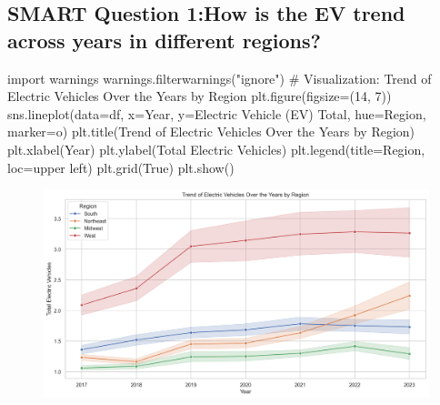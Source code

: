 \documentclass[
  letterpaper,
  DIV=11,
  numbers=noendperiod]{scrartcl}
\newenvironment{Shaded}{\begin{snugshade}}{\end{snugshade}}
\newcommand{\CommentTok}[1]{\textcolor[rgb]{0.37,0.37,0.37}{#1}}
\newcommand{\DecValTok}[1]{\textcolor[rgb]{0.68,0.00,0.00}{#1}}
\newcommand{\ImportTok}[1]{\textcolor[rgb]{0.00,0.46,0.62}{#1}}
\newcommand{\NormalTok}[1]{\textcolor[rgb]{0.00,0.23,0.31}{#1}}
\newcommand{\OperatorTok}[1]{\textcolor[rgb]{0.37,0.37,0.37}{#1}}
\newcommand{\StringTok}[1]{\textcolor[rgb]{0.13,0.47,0.30}{#1}}
\newcommand{\VariableTok}[1]{\textcolor[rgb]{0.07,0.07,0.07}{#1}}
\begin{document}
\hypertarget{smart-question-1how-is-the-ev-trend-across-years-in-different-regions}{%
\subsection{SMART Question 1:How is the EV trend across years in
different
regions?}\label{smart-question-1how-is-the-ev-trend-across-years-in-different-regions}}

\begin{Shaded}
\begin{Highlighting}[]
\ImportTok{import}\NormalTok{ warnings}
\NormalTok{warnings.filterwarnings(}\StringTok{"ignore"}\NormalTok{)}
\CommentTok{\# Visualization: Trend of Electric Vehicles Over the Years by Region}
\NormalTok{plt.figure(figsize}\OperatorTok{=}\NormalTok{(}\DecValTok{14}\NormalTok{, }\DecValTok{7}\NormalTok{))}
\NormalTok{sns.lineplot(data}\OperatorTok{=}\NormalTok{df, x}\OperatorTok{=}\StringTok{\textquotesingle{}Year\textquotesingle{}}\NormalTok{, y}\OperatorTok{=}\StringTok{\textquotesingle{}Electric Vehicle (EV) Total\textquotesingle{}}\NormalTok{, hue}\OperatorTok{=}\StringTok{\textquotesingle{}Region\textquotesingle{}}\NormalTok{, marker}\OperatorTok{=}\StringTok{\textquotesingle{}o\textquotesingle{}}\NormalTok{)}
\NormalTok{plt.title(}\StringTok{\textquotesingle{}Trend of Electric Vehicles Over the Years by Region\textquotesingle{}}\NormalTok{)}
\NormalTok{plt.xlabel(}\StringTok{\textquotesingle{}Year\textquotesingle{}}\NormalTok{)}
\NormalTok{plt.ylabel(}\StringTok{\textquotesingle{}Total Electric Vehicles\textquotesingle{}}\NormalTok{)}
\NormalTok{plt.legend(title}\OperatorTok{=}\StringTok{\textquotesingle{}Region\textquotesingle{}}\NormalTok{, loc}\OperatorTok{=}\StringTok{\textquotesingle{}upper left\textquotesingle{}}\NormalTok{)}
\NormalTok{plt.grid(}\VariableTok{True}\NormalTok{)}
\NormalTok{plt.show()}
\end{Highlighting}
\end{Shaded}

\begin{figure}[H]

{\centering \includegraphics{SummaryPaper_FinalProject_T1_files/figure-pdf/cell-11-output-1.png}

}

\end{figure}
\end{document}
